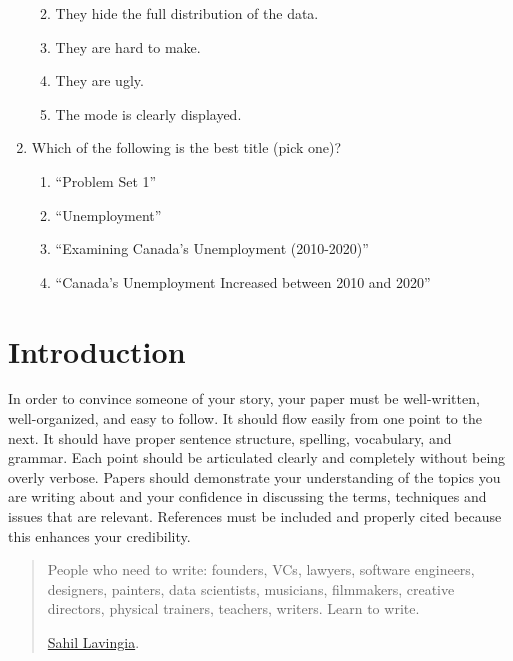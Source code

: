 \documentclass[
]{book}
\providecommand{\tightlist}{%
  \setlength{\itemsep}{0pt}\setlength{\parskip}{0pt}}
\begin{document}
\begin{enumerate}
  \begin{enumerate}
  \def\labelenumii{\alph{enumii}.}
  \tightlist
  \item
    They hide the full distribution of the data.
  \item
    They are hard to make.
  \item
    They are ugly.
  \item
    The mode is clearly displayed.
  \end{enumerate}
\item
  Which of the following is the best title (pick one)?

  \begin{enumerate}
  \def\labelenumii{\alph{enumii}.}
  \tightlist
  \item
    ``Problem Set 1''
  \item
    ``Unemployment''
  \item
    ``Examining Canada's Unemployment (2010-2020)''
  \item
    ``Canada's Unemployment Increased between 2010 and 2020''
  \end{enumerate}
\end{enumerate}

\hypertarget{introduction-4}{%
\section{Introduction}\label{introduction-4}}

In order to convince someone of your story, your paper must be well-written, well-organized, and easy to follow. It should flow easily from one point to the next. It should have proper sentence structure, spelling, vocabulary, and grammar. Each point should be articulated clearly and completely without being overly verbose. Papers should demonstrate your understanding of the topics you are writing about and your confidence in discussing the terms, techniques and issues that are relevant. References must be included and properly cited because this enhances your credibility.

\begin{quote}
People who need to write: founders, VCs, lawyers, software engineers, designers, painters, data scientists, musicians, filmmakers, creative directors, physical trainers, teachers, writers.
Learn to write.

\href{https://twitter.com/shl/status/1224346643585089536}{Sahil Lavingia}.
\end{quote}
\end{document}
